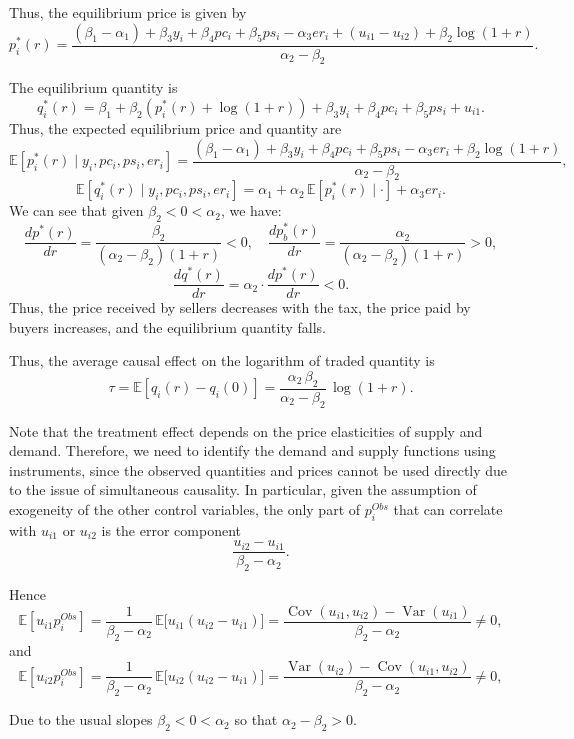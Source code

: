 Thus, the equilibrium price is given by
\[
p_i^*(r) = \frac{(\beta_1 - \alpha_1) + \beta_3 y_i + \beta_4 pc_i + \beta_5 ps_i - \alpha_3 er_i + (u_{i1} - u_{i2}) + \beta_2 \log(1+r)}{\alpha_2 - \beta_2}.
\]

The equilibrium quantity is
\[
q_i^*(r) = \beta_1 + \beta_2\left(p_i^*(r) + \log(1+r)\right) + \beta_3 y_i + \beta_4 pc_i + \beta_5 ps_i + u_{i1}.
\]
Thus, the expected equilibrium price and quantity are
\[
\mathbb{E}[p_i^*(r)\mid y_i, pc_i, ps_i, er_i]
=
\frac{(\beta_1 - \alpha_1) + \beta_3 y_i + \beta_4 pc_i + \beta_5 ps_i - \alpha_3 er_i + \beta_2 \log(1+r)}{\alpha_2 - \beta_2},
\]
\[
\mathbb{E}[q_i^*(r)\mid y_i, pc_i, ps_i, er_i]
=
\alpha_1 + \alpha_2 \,\mathbb{E}[p_i^*(r)\mid \cdot] + \alpha_3 er_i.
\]
We can see that given $\beta_2 < 0 < \alpha_2$, we have:
\[
\frac{d p^*(r)}{dr} = \frac{\beta_2}{(\alpha_2 - \beta_2)(1+r)} < 0, \quad
\frac{d p_b^*(r)}{dr} = \frac{\alpha_2}{(\alpha_2 - \beta_2)(1+r)} > 0,
\]
\[
\frac{d q^*(r)}{dr} = \alpha_2 \cdot \frac{d p^*(r)}{dr} < 0.
\]
Thus, the price received by sellers decreases with the tax, the price paid by buyers increases, and the equilibrium quantity falls.
  
Thus, the average causal effect on the logarithm of traded quantity is
\[
\tau = \mathbb{E}[q_i(r) - q_i(0)]= \frac{\alpha_2 \, \beta_2}{\alpha_2 - \beta_2}\,\log(1+r).
\]

Note that the treatment effect depends on the price elasticities of supply and demand. Therefore, we need to identify the demand and supply functions using instruments, since the observed quantities and prices cannot be used directly due to the issue of simultaneous causality. In particular, given the assumption of exogeneity of the other control variables, the only part of $p_i^{Obs}$ that can correlate with $u_{i1}$ or $u_{i2}$ is the error component
\[
\frac{u_{i2}-u_{i1}}{\beta_2-\alpha_2}.
\]

Hence
\[
\mathbb{E}[u_{i1}p_i^{Obs}]
=\frac{1}{\beta_2-\alpha_2}\,\mathbb{E}\!\big[u_{i1}(u_{i2}-u_{i1})\big]
=\frac{\operatorname{Cov}(u_{i1},u_{i2})-\operatorname{Var}(u_{i1})}{\beta_2-\alpha_2}\neq 0,
\]
and
\[
\mathbb{E}[u_{i2}p_i^{Obs}]
=\frac{1}{\beta_2-\alpha_2}\,\mathbb{E}\!\big[u_{i2}(u_{i2}-u_{i1})\big]
=\frac{\operatorname{Var}(u_{i2})-\operatorname{Cov}(u_{i1},u_{i2})}{\beta_2-\alpha_2}\neq 0,
\]

Due to the usual slopes $\beta_2<0<\alpha_2$ so that $\alpha_2-\beta_2>0$.

